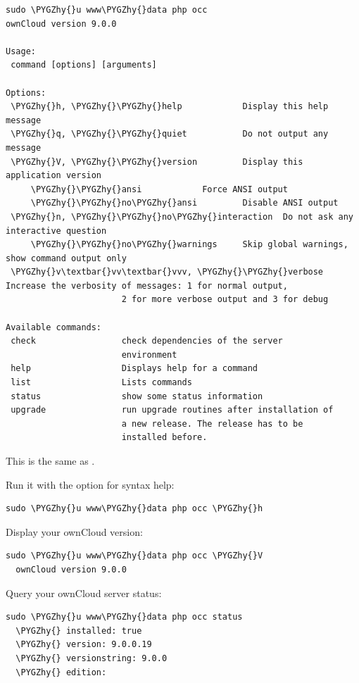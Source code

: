 \documentclass[letterpaper,10pt,english]{sphinxmanual}
\def\PYGZhy{\char`\-}
\begin{document}
\begin{Verbatim}[commandchars=\\\{\}]
sudo \PYGZhy{}u www\PYGZhy{}data php occ
ownCloud version 9.0.0

Usage:
 command [options] [arguments]

Options:
 \PYGZhy{}h, \PYGZhy{}\PYGZhy{}help            Display this help message
 \PYGZhy{}q, \PYGZhy{}\PYGZhy{}quiet           Do not output any message
 \PYGZhy{}V, \PYGZhy{}\PYGZhy{}version         Display this application version
     \PYGZhy{}\PYGZhy{}ansi            Force ANSI output
     \PYGZhy{}\PYGZhy{}no\PYGZhy{}ansi         Disable ANSI output
 \PYGZhy{}n, \PYGZhy{}\PYGZhy{}no\PYGZhy{}interaction  Do not ask any interactive question
     \PYGZhy{}\PYGZhy{}no\PYGZhy{}warnings     Skip global warnings, show command output only
 \PYGZhy{}v\textbar{}vv\textbar{}vvv, \PYGZhy{}\PYGZhy{}verbose  Increase the verbosity of messages: 1 for normal output,
                       2 for more verbose output and 3 for debug

Available commands:
 check                 check dependencies of the server
                       environment
 help                  Displays help for a command
 list                  Lists commands
 status                show some status information
 upgrade               run upgrade routines after installation of
                       a new release. The release has to be
                       installed before.
\end{Verbatim}

This is the same as .

Run it with the  option for syntax help:

\begin{Verbatim}[commandchars=\\\{\}]
sudo \PYGZhy{}u www\PYGZhy{}data php occ \PYGZhy{}h
\end{Verbatim}

Display your ownCloud version:

\begin{Verbatim}[commandchars=\\\{\}]
sudo \PYGZhy{}u www\PYGZhy{}data php occ \PYGZhy{}V
  ownCloud version 9.0.0
\end{Verbatim}

Query your ownCloud server status:

\begin{Verbatim}[commandchars=\\\{\}]
sudo \PYGZhy{}u www\PYGZhy{}data php occ status
  \PYGZhy{} installed: true
  \PYGZhy{} version: 9.0.0.19
  \PYGZhy{} versionstring: 9.0.0
  \PYGZhy{} edition:
\end{Verbatim}
\end{document}
